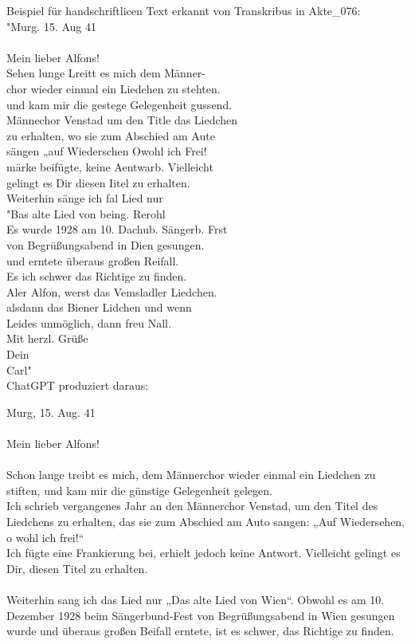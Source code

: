 \documentclass[12pt, a4paper, ngerman, bidi=default]{article}
\begin{document}
    Beispiel für handschriftlicen Text erkannt von Transkribus in Akte\_076: \\
    "Murg. 15. Aug 41 \\
    \\
    Mein lieber Alfons! \\
    Sehen lunge Lreitt es mich dem Männer- \\
    chor wieder einmal ein Liedehen zu stehten. \\
    und kam mir die gestege Gelegenheit gussend. \\
    Männechor Venstad um den Title das Liedchen \\
    zu erhalten, wo sie zum Abschied am Aute \\
    sängen „auf Wiederschen Owohl ich Frei! \\
    märke beifügte, keine Aentwarb. Vielleicht \\
    gelingt es Dir diesen Iitel zu erhalten. \\
    Weiterhin sänge ich fal Lied nur \\
    "Bas alte Lied von being. Rerohl \\
    Es wurde 1928 am 10. Dachub. Sängerb. Frst \\
    von Begrüßungsabend in Dien gesungen. \\
    und erntete überaus großen Reifall. \\
    Es ich schwer das Richtige zu finden. \\
    Aler Alfon, werst das Vemsladler Liedchen. \\
    alsdann das Biener Lidchen und wenn \\
    Leides unmöglich, dann freu Nall. \\
    Mit herzl. Grüße \\
    Dein \\
    Carl" \\

    ChatGPT produziert daraus:

    Murg, 15. Aug. 41\\
    \\
Mein lieber Alfons!\\
\\
Schon lange treibt es mich, dem Männerchor wieder einmal ein Liedchen zu stiften, und kam mir die günstige Gelegenheit gelegen.\\
Ich schrieb vergangenes Jahr an den Männerchor Venstad, um den Titel des Liedchens zu erhalten, das sie zum Abschied am Auto sangen: „Auf Wiedersehen, o wohl ich frei!“\\
Ich fügte eine Frankierung bei, erhielt jedoch keine Antwort. Vielleicht gelingt es Dir, diesen Titel zu erhalten.\\
\\
Weiterhin sang ich das Lied nur „Das alte Lied von Wien“. Obwohl es am 10. Dezember 1928 beim Sängerbund-Fest von Begrüßungsabend in Wien gesungen wurde und überaus großen Beifall erntete, ist es schwer, das Richtige zu finden.\\
\end{document}
